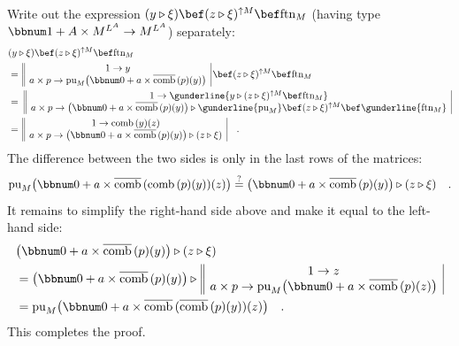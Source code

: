 Write out the expression $(y\triangleright\xi)\bef(z\triangleright\xi)^{\uparrow M}\bef\text{ftn}_{M}$
(having type $\bbnum 1+A\times M^{L^{A}}\rightarrow M^{L^{A}}$) separately:
\begin{align*}
 & (y\triangleright\xi)\bef(z\triangleright\xi)^{\uparrow M}\bef\text{ftn}_{M}\\
 & =\,\begin{array}{||c|}
1\rightarrow y\\
a\times p\rightarrow\text{pu}_{M}\big(\bbnum 0+a\times\overline{\text{comb}}\,(p)(y)\big)
\end{array}\,\bef(z\triangleright\xi)^{\uparrow M}\bef\text{ftn}_{M}\\
 & =\,\,\begin{array}{||c|}
1\rightarrow\gunderline{y\triangleright(z\triangleright\xi)^{\uparrow M}\bef\text{ftn}_{M}}\\
a\times p\rightarrow\big(\bbnum 0+a\times\overline{\text{comb}}\,(p)(y)\big)\triangleright\gunderline{\text{pu}_{M}}\bef(z\triangleright\xi)^{\uparrow M}\bef\gunderline{\text{ftn}_{M}}
\end{array}\\
 & =\,\begin{array}{||c|}
1\rightarrow\text{comb}\,(y)(z)\\
a\times p\rightarrow\big(\bbnum 0+a\times\overline{\text{comb}}\,(p)(y)\big)\triangleright(z\triangleright\xi)
\end{array}\quad.
\end{align*}
The difference between the two sides is only in the last rows of the
matrices:
\[
\text{pu}_{M}\big(\bbnum 0+a\times\overline{\text{comb}}\,(\text{comb}\,(p)(y))(z)\big)\overset{?}{=}\big(\bbnum 0+a\times\overline{\text{comb}}\,(p)(y)\big)\triangleright(z\triangleright\xi)\quad.
\]
It remains to simplify the right-hand side above and make it equal
to the left-hand side:
\begin{align*}
 & \big(\bbnum 0+a\times\overline{\text{comb}}\,(p)(y)\big)\triangleright(z\triangleright\xi)\\
 & =\big(\bbnum 0+a\times\overline{\text{comb}}\,(p)(y)\big)\triangleright\,\begin{array}{||c|}
1\rightarrow z\\
a\times p\rightarrow\text{pu}_{M}\big(\bbnum 0+a\times\overline{\text{comb}}\,(p)(z)\big)
\end{array}\\
 & =\text{pu}_{M}\big(\bbnum 0+a\times\overline{\text{comb}}\,(\overline{\text{comb}}\,(p)(y))(z)\big)\quad.
\end{align*}
This completes the proof.

